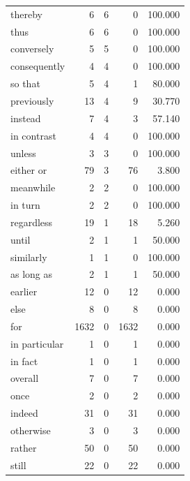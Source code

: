 \begin{table}
\begin{tabular}{lrrrr}
thereby & 6 & 6 & 0 & 100.000 \\
thus & 6 & 6 & 0 & 100.000 \\
conversely & 5 & 5 & 0 & 100.000 \\
consequently & 4 & 4 & 0 & 100.000 \\
so that & 5 & 4 & 1 & 80.000 \\
previously & 13 & 4 & 9 & 30.770 \\
instead & 7 & 4 & 3 & 57.140 \\
in contrast & 4 & 4 & 0 & 100.000 \\
unless & 3 & 3 & 0 & 100.000 \\
either or & 79 & 3 & 76 & 3.800 \\
meanwhile & 2 & 2 & 0 & 100.000 \\
in turn & 2 & 2 & 0 & 100.000 \\
regardless & 19 & 1 & 18 & 5.260 \\
until & 2 & 1 & 1 & 50.000 \\
similarly & 1 & 1 & 0 & 100.000 \\
as long as & 2 & 1 & 1 & 50.000 \\
earlier & 12 & 0 & 12 & 0.000 \\
else & 8 & 0 & 8 & 0.000 \\
for & 1632 & 0 & 1632 & 0.000 \\
in particular & 1 & 0 & 1 & 0.000 \\
in fact & 1 & 0 & 1 & 0.000 \\
overall & 7 & 0 & 7 & 0.000 \\
once & 2 & 0 & 2 & 0.000 \\
indeed & 31 & 0 & 31 & 0.000 \\
otherwise & 3 & 0 & 3 & 0.000 \\
rather & 50 & 0 & 50 & 0.000 \\
still & 22 & 0 & 22 & 0.000 \\
\bottomrule
\end{tabular}
\end{table}

